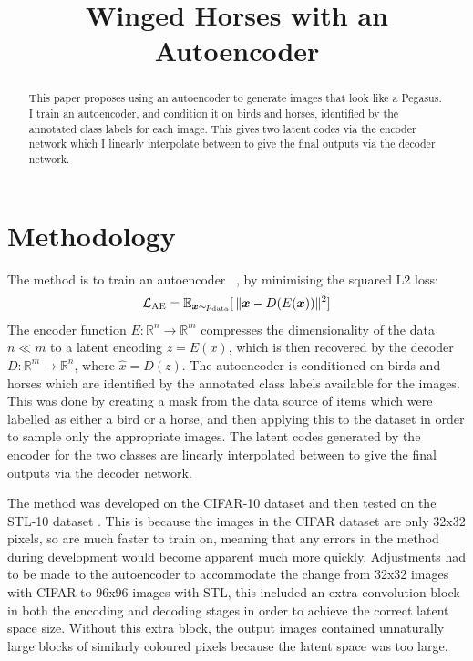 \documentclass{article}
\title{Winged Horses with an Autoencoder}
\begin{document}
\maketitle
\begin{abstract}
    This paper proposes using an autoencoder to generate images that look like a Pegasus. 
    I train an autoencoder, and condition it on birds and horses, identified by the annotated class labels for each image. 
    This gives two latent codes via the encoder network which I linearly interpolate between to give the final outputs 
    via the decoder network. 
\end{abstract}

\section{Methodology}
The method is to train an autoencoder ~\cite{kramer1991nonlinear}, by minimising the squared L2 loss:
\begin{equation}
    \mathcal{L}_{\textrm{AE}} = \mathbb{E}_{{\bm{x}}\sim p_{\textrm{data}}}[\, \lVert {\bm{x}} - D(E({\bm{x}})) \rVert^2 ]
\end{equation}
The encoder function $E : \mathbb{R}^n \rightarrow\mathbb{R}^m$ compresses the dimensionality of the data $n \ll m$ to a latent encoding 
$z = E(x)$, which is then recovered by the decoder $D: \mathbb{R}^m \rightarrow \mathbb{R}^n$, where $\hat{x} = D(z)$. 
The autoencoder is conditioned on birds and horses which are identified by the annotated class labels available for the images. 
This was done by creating a mask from the data source of items which were labelled as either a bird or a horse, 
and then applying this to the dataset in order to sample only the appropriate images. 
The latent codes generated by the encoder for the two classes are linearly interpolated between to give the final 
outputs via the decoder network. 

The method was developed on the CIFAR-10 dataset \cite{krizhevsky2009learning} and then tested on the STL-10 dataset \cite{pmlr-v15-coates11a}. 
This is because the images in the CIFAR dataset are only 32x32 pixels, so are much faster to train on, meaning that any errors in the 
method during development would become apparent much more quickly. 
Adjustments had to be made to the autoencoder to accommodate the change from 32x32 images with CIFAR to 96x96 images with STL, 
this included an extra convolution block in both the encoding and decoding stages in order to achieve the correct latent space size. 
Without this extra block, the output images contained unnaturally large blocks of similarly coloured pixels because the latent space was too large. 
\end{document}
